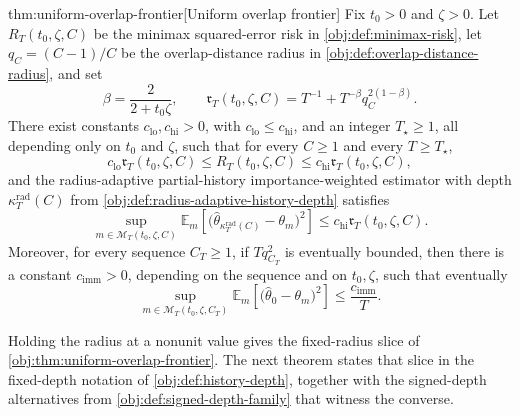 \documentclass[11pt]{article}
\begin{document}
\begin{theoremv}{thm:uniform-overlap-frontier}[Uniform overlap frontier]
Fix \(t_0>0\) and \(\zeta>0\).  Let \(R_T(t_0,\zeta,C)\) be the minimax squared-error risk in \cref{obj:def:minimax-risk}, let \(q_C=(C-1)/C\) be the overlap-distance radius in \cref{obj:def:overlap-distance-radius}, and set
\[
\beta=\frac{2}{2+t_0\zeta},
\qquad
\mathfrak r_T(t_0,\zeta,C)
=
T^{-1}+T^{-\beta}q_C^{2(1-\beta)} .
\]
There exist constants \(c_{\mathrm{lo}},c_{\mathrm{hi}}>0\), with
\(c_{\mathrm{lo}}\le c_{\mathrm{hi}}\), and an integer \(T_\star\ge 1\), all depending only on \(t_0\) and \(\zeta\), such that for every \(C\ge 1\) and every \(T\ge T_\star\),
\[
c_{\mathrm{lo}}\mathfrak r_T(t_0,\zeta,C)
\le
R_T(t_0,\zeta,C)
\le
c_{\mathrm{hi}}\mathfrak r_T(t_0,\zeta,C),
\]
and the radius-adaptive partial-history importance-weighted estimator with depth
\(\kappa_T^{\mathrm{rad}}(C)\) from \cref{obj:def:radius-adaptive-history-depth} satisfies
\[
\sup_{m\in\mathcal M_T(t_0,\zeta,C)}
\mathbb E_m\!\left[
  \bigl(\widehat\theta_{\kappa_T^{\mathrm{rad}}(C)}-\theta_m\bigr)^2
\right]
\le
c_{\mathrm{hi}}\mathfrak r_T(t_0,\zeta,C).
\]
Moreover, for every sequence \(C_T\ge 1\), if \(Tq_{C_T}^2\) is eventually bounded, then there is a constant \(c_{\mathrm{imm}}>0\), depending on the sequence and on \(t_0,\zeta\), such that eventually
\[
\sup_{m\in\mathcal M_T(t_0,\zeta,C_T)}
\mathbb E_m\!\left[
  \bigl(\widehat\theta_{0}-\theta_m\bigr)^2
\right]
\le
\frac{c_{\mathrm{imm}}}{T}.
\]
\end{theoremv}

Holding the radius at a nonunit value gives the fixed-radius slice of \cref{obj:thm:uniform-overlap-frontier}. The next theorem states that slice in the fixed-depth notation of \cref{obj:def:history-depth}, together with the signed-depth alternatives from \cref{obj:def:signed-depth-family} that witness the converse.
\end{document}
